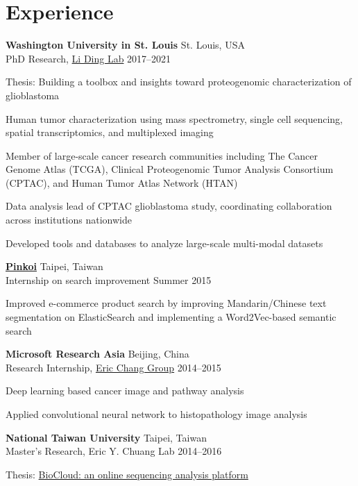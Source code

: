 \section{Experience}

\begin{outerlist}

	\item \textbf{Washington University in St. Louis} \hfill St. Louis, USA\\
	PhD Research, \href{https://dinglab.wustl.edu/}{Li Ding Lab} \hfill
	2017--2021
	\begin{innerlist}
		\item Thesis: Building a toolbox and insights toward proteogenomic characterization of glioblastoma
		\item Human tumor characterization using mass spectrometry, single cell sequencing, spatial transcriptomics, and multiplexed imaging
		\item Member of large-scale cancer research communities including The Cancer Genome Atlas (TCGA), Clinical Proteogenomic Tumor Analysis Consortium (CPTAC), and Human Tumor Atlas Network (HTAN)
		\item Data analysis lead of CPTAC glioblastoma study, coordinating collaboration across institutions nationwide
		\item Developed tools and databases to analyze large-scale multi-modal datasets
	\end{innerlist}

	\item \href{http://pinkoi.com}{\textbf{Pinkoi}} \hfill Taipei, Taiwan\\
	Internship on search improvement \hfill
	Summer 2015
	\begin{innerlist}
		\item Improved e-commerce product search by improving Mandarin/Chinese text segmentation on ElasticSearch and implementing a Word2Vec-based semantic search
	\end{innerlist}

	\item \textbf{Microsoft Research Asia} \hfill Beijing, China\\
	Research Internship, \href{https://www.microsoft.com/en-us/research/people/echang/}{Eric Chang Group} \hfill
	2014--2015
	\begin{innerlist}
		\item Deep learning based cancer image and pathway analysis
		\item Applied convolutional neural network to histopathology image analysis
	\end{innerlist}

	\item \textbf{National Taiwan University} \hfill Taipei, Taiwan\\
	Master's Research, Eric Y. Chuang Lab \hfill
	2014--2016
	\begin{innerlist}
		\item Thesis: \href{https://doi.org/10.6342/NTU201601295}{BioCloud: an online sequencing analysis platform}
	\end{innerlist}

\end{outerlist}
